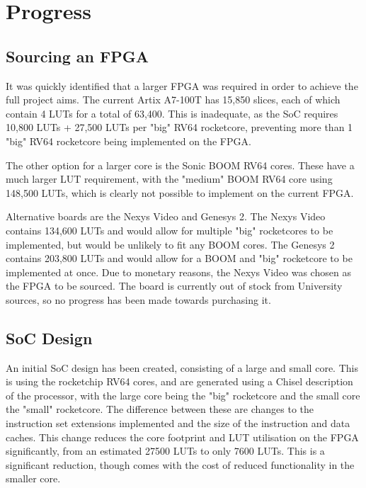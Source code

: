 \section{Progress}
\label{sec:progress}
\subsection{Sourcing an FPGA}
It was quickly identified that a larger FPGA was required in order to achieve the full project aims. The current Artix A7-100T\cite{} has 15,850 slices, each of which contain 4 LUTs for a total of 63,400. This is inadequate, as the SoC requires 10,800 LUTs + 27,500 LUTs per "big" RV64 rocketcore, preventing more than 1 "big" RV64 rocketcore being implemented on the FPGA.

The other option for a larger core is the Sonic BOOM RV64 cores. These have a much larger LUT requirement, with the "medium" BOOM\cite{} RV64 core using 148,500 LUTs, which is clearly not possible to implement on the current FPGA.

Alternative boards are the Nexys Video\cite{} and Genesys 2\cite{}. The Nexys Video contains 134,600 LUTs and would allow for multiple "big" rocketcores to be implemented, but would be unlikely to fit any BOOM cores. The Genesys 2 contains 203,800 LUTs and would allow for a BOOM and "big" rocketcore to be implemented at once. Due to monetary reasons, the Nexys Video was chosen as the FPGA to be sourced. The board is currently out of stock from University sources, so no progress has been made towards purchasing it.

\subsection{SoC Design}
An initial SoC design has been created, consisting of a large and small core. This is using the rocketchip\cite{rocketchip} RV64 cores, and are generated using a Chisel description of the processor, with the large core being the "big" rocketcore and the small core the "small" rocketcore. The difference between these are changes to the instruction set extensions implemented and the size of the instruction and data caches. This change reduces the core footprint and LUT utilisation on the FPGA significantly, from an estimated 27500 LUTs to only 7600 LUTs. This is a significant reduction, though comes with the cost of reduced functionality in the smaller core.


